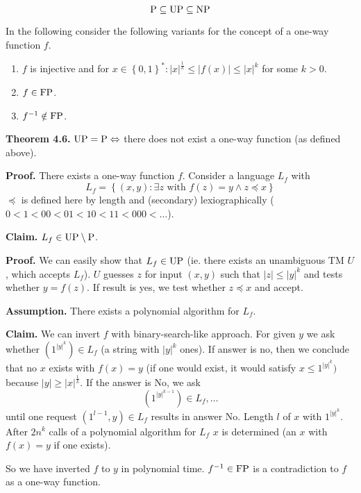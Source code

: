 \documentclass[a4paper]{article}
\newcommand{\cls}[1]{\rm{#1}}
\newcommand{\set}[1]{\left\{#1\right\}}
\begin{document}
\[
  \cls{P} \subseteq \cls{UP} \subseteq \cls{NP}
\]

In the following consider the following variants for the concept of a
one-way function $f$.
\begin{enumerate}
  \item $f$ is injective and for $x \in \set{0,1}^*: |x|^{\frac1{k}} \leq
        |f(x)| \leq |x|^k$ for some $k > 0$.
  \item $f \in \cls{FP}$.
  \item $f^{-1} \notin \cls{FP}$.
\end{enumerate}

\textbf{Theorem 4.6.} $\cls{UP} = \cls{P} \Leftrightarrow$ there does not
exist a one-way function (as defined above).

\textbf{Proof.}
There exists a one-way function $f$. Consider a language $L_f$ with
\[
  L_f = \set{(x,y) : \exists z \text{ with } f(z) = y \land z \preccurlyeq x}
\]
$\preccurlyeq$ is defined here by length and (secondary) lexiographically
($0 < 1 < 00 < 01 < 10 < 11 < 000 < \ldots$).

\textbf{Claim.} $L_f \in \cls{UP} \setminus \cls{P}$.

\textbf{Proof.}
We can easily show that $L_f \in \cls{UP}$ (ie. there exists an unambiguous
TM $U$, which accepts $L_f$). $U$ guesses $z$ for input $(x, y)$ such that
$|z| \leq |y|^k$ and tests whether $y = f(z)$. If result is yes, we test
whether $z \preccurlyeq x$ and accept.

\textbf{Assumption.}
There exists a polynomial algorithm for $L_f$.

\textbf{Claim.}
We can invert $f$ with binary-search-like approach. For given $y$ we ask
whether $(1^{|y|^k}) \in L_f$ (a string with $|y|^k$ ones). If answer is
no, then we conclude that no $x$ exists with $f(x) = y$ (if one would exist,
it would satisfy $x \leq 1^{|y|^k})$ because $|y| \geq |x|^{\frac1{k}}$.
If the answer is No, we ask
\[
    (1^{|y|^{k-1}}) \in L_f, \ldots
\]
until one request $(1^{l-1}, y) \in L_f$ results in answer No. Length $l$
of $x$ with $1^{|y|^k}$. After $2n^k$ calls of a polynomial algorithm for
$L_f$ $x$ is determined (an $x$ with $f(x) = y$ if one exists).

So we have inverted $f$ to $y$ in polynomial time.
$f^{-1} \in \cls{FP}$ is a contradiction to $f$ as a one-way function.
\end{document}
